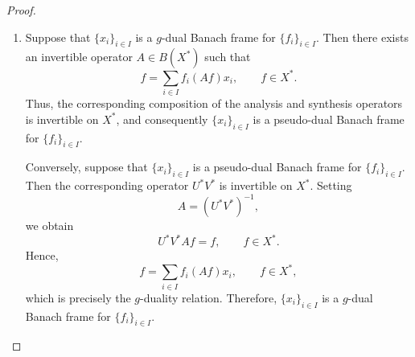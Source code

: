 \documentclass[10pt,a4paper]{amsart}
\begin{document}
\begin{proof}
\begin{enumerate}
		\item Suppose that \(\{x_i\}_{i\in I}\) is a \(g\)-dual Banach frame
		for \(\{f_i\}_{i\in I}\). Then there exists an invertible operator
		\(A\in B(X^*)\) such that
		\[
		f
		=
		\sum_{i\in I}f_i(Af)x_i,
		\qquad f\in X^*.
		\]
		Thus, the corresponding composition of the analysis and synthesis
		operators is invertible on \(X^*\), and consequently
		\(\{x_i\}_{i\in I}\) is a pseudo-dual Banach frame for
		\(\{f_i\}_{i\in I}\).
		
		Conversely, suppose that \(\{x_i\}_{i\in I}\) is a pseudo-dual
		Banach frame for \(\{f_i\}_{i\in I}\). Then the corresponding
		operator \(U^*V^*\) is invertible on \(X^*\). Setting
		\[
		A=(U^*V^*)^{-1},
		\]
		we obtain
		\[
		U^*V^*Af=f,
		\qquad f\in X^*.
		\]
		Hence,
		\[
		f
		=
		\sum_{i\in I}f_i(Af)x_i,
		\qquad f\in X^*,
		\]
		which is precisely the \(g\)-duality relation. Therefore,
		\(\{x_i\}_{i\in I}\) is a \(g\)-dual Banach frame for
		\(\{f_i\}_{i\in I}\).
	\end{enumerate}
\end{proof}
\end{document}
